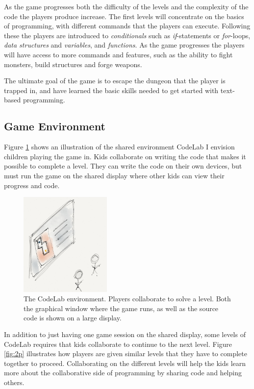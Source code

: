 \documentclass[12pt,journal,compsoc]{IEEEtran}
\begin{document}
As the game progresses both the difficulty of the levels and the complexity of
the code the players produce increase. The first levels will concentrate on the
basics of programming, with different commands that the players can execute.
Following these the players are introduced to \emph{conditionals} such as
\emph{if}-statements or \emph{for}-loops, \emph{data structures} and
\emph{variables}, and \emph{functions}. As the game progresses the players will
have access to more commands and features, such as the ability to fight
monsters, build structures and forge weapons. 

The ultimate goal of the game is to escape the dungeon that the player is
trapped in, and have learned the basic skills needed to get started with
text-based programming. 

\subsection{Game Environment} 
Figure \ref{fig:environ} shows an illustration of the shared environment CodeLab
I envision children playing the game in. Kids collaborate on writing the code
that makes it possible to complete a level. They can write the code on their own
devices, but must run the game on the shared display where other kids can view
their progress and code. 

\begin{figure}[htb]
    \begin{centering}
    \includegraphics[width=0.4\textwidth]{./figures/codelab2.png}
    \caption{The CodeLab environment. Players collaborate to solve a level. Both
    the graphical window where the game runs, as well as the source code is
    shown on a large display. } 
    \label{fig:environ}
    \end{centering} 
\end{figure}

In addition to just having one game session on the shared display, some levels
of CodeLab requires that kids collaborate to continue to the next level. Figure
\ref{fig:2p} illustrates how players are given similar levels that they have to
complete together to proceed.  Collaborating on the different levels will help
the kids learn more about the collaborative side of programming by sharing code
and helping others. 
\end{document}
